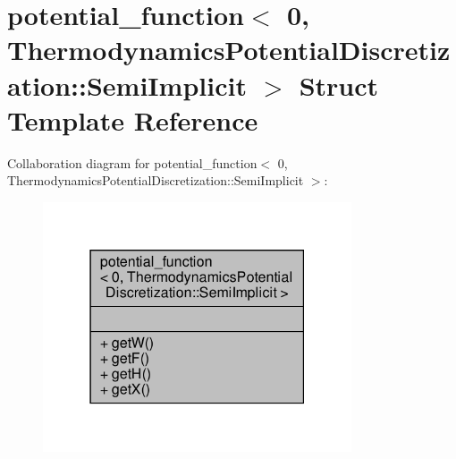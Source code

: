 \hypertarget{structpotential__function_3_010_00_01ThermodynamicsPotentialDiscretization_1_1SemiImplicit_01_4}{}\section{potential\+\_\+function$<$ 0, Thermodynamics\+Potential\+Discretization\+:\+:Semi\+Implicit $>$ Struct Template Reference}
\label{structpotential__function_3_010_00_01ThermodynamicsPotentialDiscretization_1_1SemiImplicit_01_4}


Collaboration diagram for potential\+\_\+function$<$ 0, Thermodynamics\+Potential\+Discretization\+:\+:Semi\+Implicit $>$\+:\nopagebreak
\begin{figure}[H]
\begin{center}
\leavevmode
\includegraphics[width=259pt]{structpotential__function_3_010_00_01ThermodynamicsPotentialDiscretization_1_1SemiImplicit_01_4__coll__graph}
\end{center}
\end{figure}
